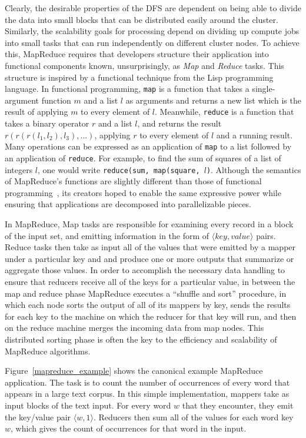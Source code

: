 Clearly, the desirable properties of the DFS are dependent on being able to divide the data into small blocks that can be distributed easily around the cluster. Similarly, the scalability goals for processing depend on dividing up compute jobs into small tasks that can run independently on different cluster nodes. To achieve this, MapReduce requires that developers structure their application into functional components known, unsurprisingly, as \emph{Map} and \emph{Reduce} tasks. This structure is inspired by a functional technique from the Lisp programming language. In functional programming, \texttt{map} is a function that takes a single-argument function $m$ and a list $l$ as arguments and returns a new list which is the result of applying $m$ to every element of $l$. Meanwhile, \texttt{reduce} is a function that takes a binary operator $r$ and a list $l$, and returns the result $r(r(r(l_1,l_2),l_3),...)$, applying $r$ to every element of $l$ and a running result. Many operations can be expressed as an application of \texttt{map} to a list followed by an application of \texttt{reduce}. For example, to find the sum of squares of a list of integers $l$, one would write \texttt{reduce(sum, map(square, $l$)}. Although the semantics of MapReduce's functions are slightly different than those of functional programming~\cite{lammel20081}, its creators hoped to enable the same expressive power while ensuring that applications are decomposed into parallelizable pieces.

In MapReduce, Map tasks are responsible for examining every record in a block of the input set, and emitting information in the form of $\langle key, value \rangle$ pairs. Reduce tasks then take as input all of the values that were emitted by a mapper under a particular key and and produce one or more outputs that summarize or aggregate those values. In order to accomplish the necessary data handling to ensure that reducers receive all of the keys for a particular value, in between the map and reduce phase MapReduce executes a ``shuffle and sort'' procedure, in which each node sorts the output of all of its mappers by key, sends the results for each key to the machine on which the reducer for that key will run, and then on the reduce machine merges the incoming data from map nodes. This distributed sorting phase is often the key to the efficiency and scalability of MapReduce algorithms.

Figure~\ref{mapreduce_example} shows the canonical example MapReduce application. The task is to count the number of occurrences of every word that appears in a large text corpus. In this simple implementation, mappers take as input blocks of the text input. For every word $w$ that they encounter, they emit the key/value pair $\langle w, 1 \rangle$. Reducers then sum all of the values for each word key $w$, which gives the count of occurrences for that word in the input.

